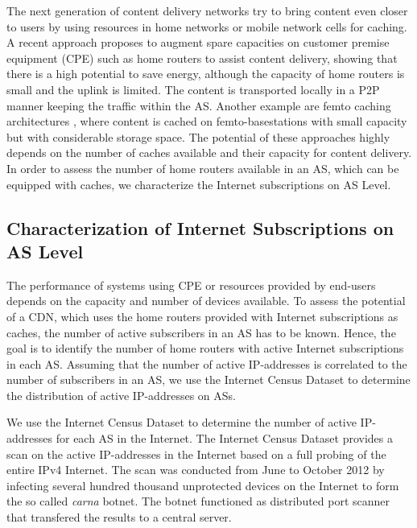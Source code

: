 The next generation of content delivery networks try to bring content even closer to users by using resources in home networks or mobile network cells for caching.
A recent approach \cite{valancius2009greening} proposes to augment spare capacities on customer premise equipment (CPE) such as home routers to assist content delivery, showing that there is a high potential to save energy, although the capacity of home routers is small and the uplink is limited.
The content is transported locally in a P2P manner keeping the traffic within the AS.
Another example are femto caching architectures \cite{golrezaei2013femtocaching}, where content is cached on femto-basestations with small capacity but with considerable storage space.
The potential of these approaches highly depends on the number of caches available and their capacity for content delivery.
In order to assess the number of home routers available in an AS, which can be equipped with caches, we characterize the Internet subscriptions on AS Level.

%

\subsection{Characterization of Internet Subscriptions on AS Level}\label{sec:aslevel:census}

The performance of systems using CPE or resources provided by end-users depends on the capacity and number of devices available.
To assess the potential of a CDN, which uses the home routers provided with Internet subscriptions as caches, the number of active subscribers in an AS has to be known.
Hence, the goal is to identify the number of home routers with active Internet subscriptions in each AS.
Assuming that the number of active IP-addresses is correlated to the number of subscribers in an AS, we use the Internet Census Dataset to determine the distribution of active IP-addresses on ASs.

We use the Internet Census Dataset \cite{carna2013} to determine the number of active IP-addresses for each AS in the Internet.
The Internet Census Dataset provides a scan on the active IP-addresses in the Internet based on a full probing of the entire IPv4 Internet.
The scan was conducted from June to October 2012 by infecting several hundred thousand unprotected devices on the Internet to form the so called \emph{carna} botnet.
The botnet functioned as distributed port scanner that transfered the results to a central server.

